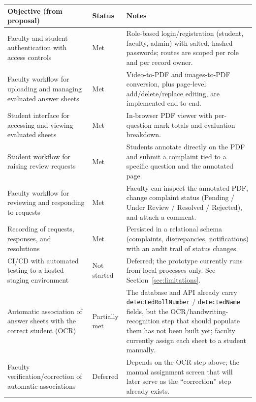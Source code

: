 \documentclass[11pt,a4paper]{article}
\begin{document}
\begin{longtable}{>{\RaggedRight}p{} >{\RaggedRight}p{} >{\RaggedRight}p{}}
\toprule
\textbf{Objective (from proposal)} & \textbf{Status} & \textbf{Notes} \\
\midrule\endhead
Faculty and student authentication with access controls & Met &
  Role-based login/registration (student, faculty, admin) with salted, hashed
  passwords; routes are scoped per role and per record owner. \\[0.6em]
Faculty workflow for uploading and managing evaluated answer sheets & Met &
  Video-to-PDF and images-to-PDF conversion, plus page-level add/delete/replace
  editing, are implemented end to end. \\[0.6em]
Student interface for accessing and viewing evaluated sheets & Met &
  In-browser PDF viewer with per-question mark totals and evaluation
  breakdown. \\[0.6em]
Student workflow for raising review requests & Met &
  Students annotate directly on the PDF and submit a complaint tied to a
  specific question and the annotated page. \\[0.6em]
Faculty workflow for reviewing and responding to requests & Met &
  Faculty can inspect the annotated PDF, change complaint status
  (Pending / Under Review / Resolved / Rejected), and attach a comment. \\[0.6em]
Recording of requests, responses, and resolutions & Met &
  Persisted in a relational schema (complaints, discrepancies, notifications)
  with an audit trail of status changes. \\[0.6em]
CI/CD with automated testing to a hosted staging environment & Not started &
  Deferred; the prototype currently runs from local processes only. See
  Section~\ref{sec:limitations}. \\[0.6em]
Automatic association of answer sheets with the correct student (OCR) & Partially met &
  The database and API already carry \texttt{detectedRollNumber} /
  \texttt{detectedName} fields, but the OCR/handwriting-recognition step that
  should populate them has not been built yet; faculty currently assign each
  sheet to a student manually. \\[0.6em]
Faculty verification/correction of automatic associations & Deferred &
  Depends on the OCR step above; the manual assignment screen that will later
  serve as the ``correction'' step already exists. \\
\bottomrule
\end{longtable}
\end{document}
